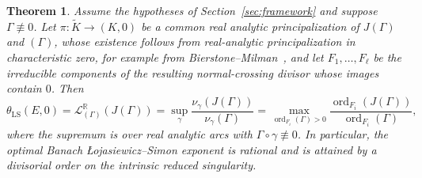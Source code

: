 \documentclass[11pt]{article}
\newtheorem{theorem}{Theorem}[section]
\theoremstyle{definition}
\theoremstyle{remark}
\begin{document}
\begin{theorem}
\label{thm:Simon-pair-formula}
Assume the hypotheses of Section~\ref{sec:framework} and suppose $\Gamma\not\equiv0$. Let $\pi:\widetilde K\to(K,0)$ be a common real analytic principalization of $J(\Gamma)$ and $(\Gamma)$, whose existence follows from real-analytic principalization in characteristic zero, for example from Bierstone--Milman~\cite{BierstoneMilman1997}, and let $F_1,\ldots,F_\ell$ be the irreducible components of the resulting normal-crossing divisor whose images contain $0$. Then
$$
\theta_{\mathrm{LS}}(E,0)
=\mathcal L^{\mathbb R}_{(\Gamma)}(J(\Gamma))
=\sup_\gamma\frac{\nu_\gamma(J(\Gamma))}{\nu_\gamma(\Gamma)}
=\max_{\operatorname{ord}_{F_i}(\Gamma)>0}
\frac{\operatorname{ord}_{F_i}(J(\Gamma))}{\operatorname{ord}_{F_i}(\Gamma)},
$$
where the supremum is over real analytic arcs with $\Gamma\circ\gamma\not\equiv0$. In particular, the optimal Banach \L{}ojasiewicz--Simon exponent is rational and is attained by a divisorial order on the intrinsic reduced singularity.
\end{theorem}
\end{document}
